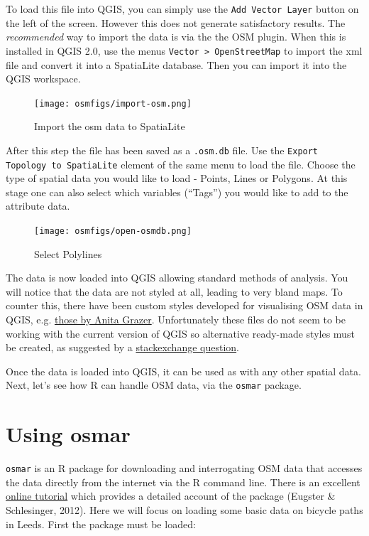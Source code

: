\documentclass[]{article}
\begin{document}
To load this file into QGIS, you can simply use the
\texttt{Add Vector Layer} button on the left of the screen. However this
does not generate satisfactory results. The \emph{recommended} way to
import the data is via the the OSM plugin. When this is installed in
QGIS 2.0, use the menus \texttt{Vector \textgreater{} OpenStreetMap} to
import the xml file and convert it into a SpatiaLite database. Then you
can import it into the QGIS workspace.

\begin{figure}[htbp]
\centering
\texttt{[image: osmfigs/import-osm.png]}
\caption{Import the osm data to SpatiaLite}
\end{figure}

After this step the file has been saved as a \texttt{.osm.db} file. Use
the \texttt{Export Topology to SpatiaLite} element of the same menu to
load the file. Choose the type of spatial data you would like to load -
Points, Lines or Polygons. At this stage one can also select which
variables (``Tags'') you would like to add to the attribute data.

\begin{figure}[htbp]
\centering
\texttt{[image: osmfigs/open-osmdb.png]}
\caption{Select Polylines}
\end{figure}

The data is now loaded into QGIS allowing standard methods of analysis.
You will notice that the data are not styled at all, leading to very
bland maps. To counter this, there have been custom styles developed for
visualising OSM data in QGIS, e.g.
\href{http://anitagraser.com/2012/02/25/light-styles-for-osm-layers-in-qgis/}{those
by Anita Grazer}. Unfortunately these files do not seem to be working
with the current version of QGIS so alternative ready-made styles must
be created, as suggested by a
\href{http://gis.stackexchange.com/questions/42645/is-there-up-to-date-osm-sld-file-for-geoserver}{stackexchange
question}.

Once the data is loaded into QGIS, it can be used as with any other
spatial data. Next, let's see how R can handle OSM data, via the
\texttt{osmar} package.

\section{Using osmar}\label{using-osmar}

\texttt{osmar} is an R package for downloading and interrogating OSM
data that accesses the data directly from the internet via the R command
line. There is an excellent
\href{http://journal.r-project.org/archive/2013-1/eugster-schlesinger.pdf}{online
tutorial} which provides a detailed account of the package (Eugster \&
Schlesinger, 2012). Here we will focus on loading some basic data on
bicycle paths in Leeds. First the package must be loaded:
\end{document}
